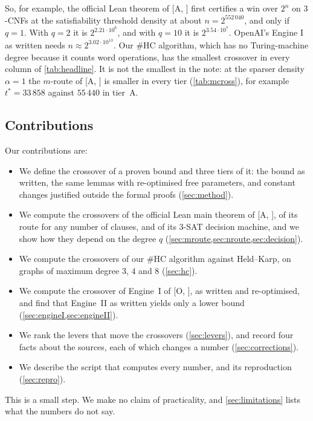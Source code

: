 \documentclass[10pt]{amsart}
\theoremstyle{definition}
\theoremstyle{remark}
\numberwithin{equation}{section}
\newcommand{\A}[1][]{\textup{[A\if\relax\detokenize{#1}\relax\else, #1\fi]}}
\newcommand{\Oa}[1][]{\textup{[O\if\relax\detokenize{#1}\relax\else, #1\fi]}}
\newcommand{\HC}{\#\mathrm{HC}}
\newcommand{\tst}{t^{*}}
\begin{document}
So, for example, the official Lean theorem of \A{} first certifies a win over $2^n$ on $3$-CNFs at
the satisfiability threshold density at about $n=2^{552\,040}$, and only if $q=1$. With $q=2$ it is
$2^{2.21\cdot10^6}$, and with $q=10$ it is $2^{3.54\cdot10^7}$. OpenAI's Engine I as written needs
$n\approx2^{3.02\cdot10^{13}}$. Our $\HC$ algorithm, which has no Turing-machine degree because it
counts word operations, has the smallest crossover in every column of \cref{tab:headline}. It is not
the smallest in the note: at the sparser density $\alpha=1$ the $m$-route of \A{} is smaller in every
tier (\cref{tab:mcross}), for example $\tst=33\,858$ against $55\,440$ in tier~A.

\subsection{Contributions}
Our contributions are:
\begin{itemize}
\item We define the crossover of a proven bound and three tiers of it: the bound as written, the
same lemmas with re-optimised free parameters, and constant changes justified outside the formal
proofs (\cref{sec:method}).
\item We compute the crossovers of the official Lean main theorem of \A, of its route for any number
of clauses, and of its $3$-SAT decision machine, and we show how they depend on the degree $q$
(\cref{sec:mroute,sec:nroute,sec:decision}).
\item We compute the crossovers of our $\HC$ algorithm against Held--Karp, on graphs of maximum
degree $3$, $4$ and $8$ (\cref{sec:hc}).
\item We compute the crossover of Engine~I of \Oa, as written and re-optimised, and find that
Engine~II as written yields only a lower bound (\cref{sec:engineI,sec:engineII}).
\item We rank the levers that move the crossovers (\cref{sec:levers}), and record four facts about
the sources, each of which changes a number (\cref{sec:corrections}).
\item We describe the script that computes every number, and its reproduction (\cref{sec:repro}).
\end{itemize}
This is a small step. We make no claim of practicality, and \cref{sec:limitations} lists what the
numbers do not say.
\end{document}
